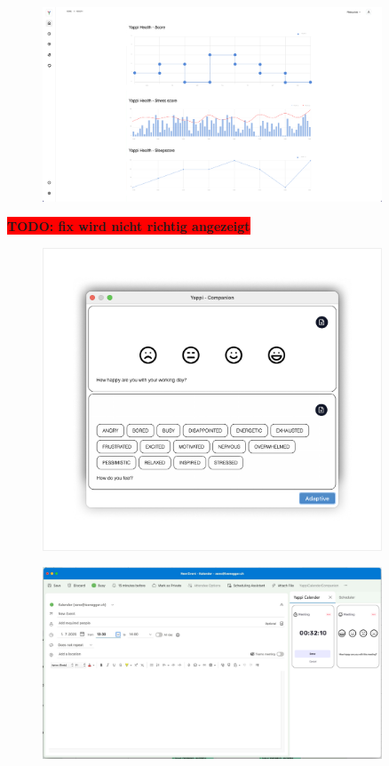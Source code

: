 \documentclass[12pt,a4paper]{report}
\newcommand{\todo}[1]{\colorbox{red}{\textbf{TODO: #1}}\\}
\begin{document}
\begin{appendices}
    \begin{figure}[H]
      \centering
      \includegraphics[width=0.90\textwidth]{../figures/mockup/IP5_Yappi_Companion_Health.pdf}
    \end{figure}

    \todo{fix wird nicht richtig angezeigt}
    \begin{figure}[H]
    \centering
    \includegraphics[width=0.90\textwidth]{../figures/mockup/IP5_Yappi_Companion_Intellij.pdf}
    \end{figure}

    \begin{figure}[H]
    \centering
    \includegraphics[width=0.90\textwidth]{../figures/mockup/IP5_Yappi_Companion_Outlook_Prototype.pdf}
    \end{figure}


\end{appendices}
\end{document}

